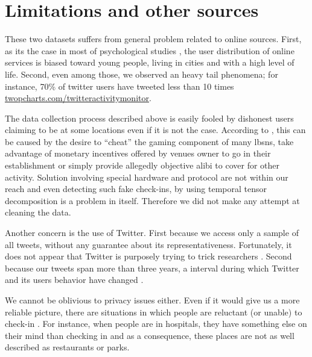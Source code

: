 \section{Limitations and other sources}
\label{sec:limitations}

These two datasets suffers from general problem related to online sources.
First, as its the case in most of psychological studies \autocite{Weird10}, the
user distribution of online services is biased toward young people, living in
cities and with a high level of life. Second, even among those, we observed an
heavy tail phenomena; for instance, 70\% of twitter users have tweeted less
than 10 times \href{http://twopcharts.com/twitteractivitymonitor}%
{\url{twopcharts.com/twitteractivitymonitor}}.


The \fs{} data collection process described above is easily fooled by dishonest users
claiming to be at some locations even if it is not the case. According to
\autocite{FakeCheckins12}, this can be caused by the desire to \enquote{cheat}
the gaming component of many \glspl{lbsn}, take advantage of monetary
incentives offered by venues owner to go in their establishment or simply
provide allegedly objective alibi to cover for other activity. Solution
involving special hardware and protocol are not within our reach
\autocite{ValidateCheckin13} and even detecting such fake check-ins, by using
temporal tensor decomposition \autocite{FindingFake14} is a problem in itself.
Therefore we did not make any attempt at cleaning the data.

Another concern is the use of Twitter. First because we access only a sample
of all tweets, without any guarantee about its representativeness.
Fortunately, it does not appear that Twitter is purposely trying to trick
researchers \autocite{TwitterBias14}. Second because our tweets span more than
three years, a interval during which Twitter and its users behavior have
changed \autocite{TwitterEvolution14}.

We cannot be oblivious to privacy issues either.
Even if it would give us a more reliable picture, there are situations in
which people are reluctant (or unable) to check-in \autocite{Privacy11}. For
instance, when people are in hospitals, they have something else on their mind
than checking in and as a consequence, these places are not as well described
as restaurants or parks.

